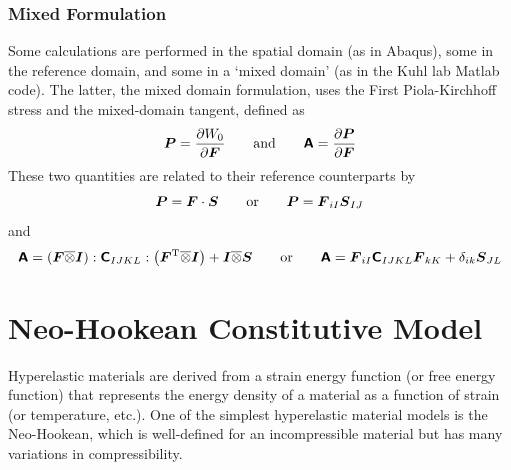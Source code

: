 \documentclass[10pt,letterpaper,oneside]{report}
\newcommand{\ten}[1]{\mbox{\boldmath $#1$}{}}
\newcommand{\tenf}[1]{\mbox{{\sffamily{\bfseries {#1}}}}}
\newcommand{\scas}[1]{\mbox{{\scriptsize{${\rm{#1}}$}}}{}}
\begin{document}


\subsubsection{Mixed Formulation}
Some calculations are performed in the spatial domain (as in Abaqus), some in the reference domain, and some in a `mixed domain' (as in the Kuhl lab Matlab code).  The latter, the mixed domain formulation, uses the First Piola-Kirchhoff stress 
and the mixed-domain tangent, defined as
\begin{equation}
\ten{P} = \frac{ \partial W_0 }{ \partial \ten{F} }
\qquad \mbox{and} \qquad
\tenf{A} = \frac{ \partial \ten{P} }{ \partial \ten{F} }
\end{equation}
These two quantities are related to their reference counterparts by 
\begin{equation}
\ten{P} = \ten{F} \cdot \ten{S} 
\qquad \mbox{or} \qquad
\ten{P} = \ten{F}_{iI} \ten{S}_{IJ}
\end{equation}
and
\begin{equation}
\tenf{A} = \left( \ten{F} \overline{\otimes} \ten{I} \right) : \tenf{C}_{IJKL} : \left( \ten{F}^{\scas{T}} \overline{\otimes} \ten{I} \right) + \ten{I} \overline{\otimes} \ten{S} 
\qquad \mbox{or} \qquad
\tenf{A} = \ten{F}_{iI} \tenf{C}_{IJKL} \ten{F}_{kK} + \delta_{ik} \ten{S}_{JL}
\end{equation}


\section{Neo-Hookean Constitutive Model} 
Hyperelastic materials are derived from a strain energy function (or free energy function) that represents the energy density of a material as a function of strain (or temperature, etc.).  One of the simplest hyperelastic material models is the Neo-Hookean, which is well-defined for an incompressible material but has many variations in compressibility.  
\end{document}
